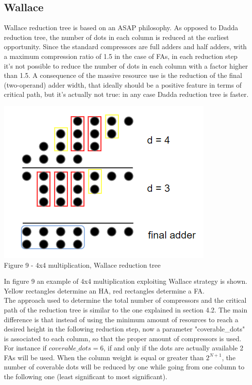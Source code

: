 \documentclass[11pt]{article} %
\begin{document}
\subsection{Wallace}
Wallace  reduction  tree  is  based  on  an  ASAP  philosophy. As opposed to Dadda reduction tree, the number of dots in each column is reduced at the earliest opportunity. Since the standard compressors are full adders and half adders, with a maximum compression ratio of 1.5 in the case of FAs, in each reduction step it's not possible to reduce the number of dots in each column with a factor higher than 1.5.
A consequence of the massive resource use is the reduction 
of the final (two-operand) adder width, that ideally should be a positive feature in terms of critical path, but it's actually not true: in any case Dadda reduction tree is faster.\\
\vspace{1em}
\begin{center}
\includegraphics[scale=.46]{wallace.PNG}\\
\small{Figure 9 - 4x4 multiplication, Wallace reduction tree}
\end{center}
\vspace{1em}
In figure 9 an example of 4x4 multiplication exploiting Wallace strategy is shown. Yellow rectangles determine an HA, red rectangles determine a FA.\\
The approach used to determine the total number of compressors and the critical path of the reduction tree is similar to the one explained in section 4.2. The main difference is that instead of using the minimum amount of resources to reach a desired height in the following reduction step, now a parameter "coverable\_dots" is associated to each column, so that the proper amount of compressors is used. For instance if $coverable\_dots = 6$, if and only if the dots are actually available 2 FAs will be used. When the column weight is equal or greater than $2^{N+1}$, the number of coverable dots will be reduced by one while going from one column to the following one (least significant to most significant).
\vspace{2em}
\end{document}
